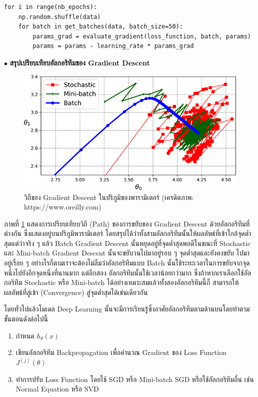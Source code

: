 \begin{lstlisting}[style=MyPython]
for i in range(nb_epochs):
    np.random.shuffle(data)
    for batch in get_batches(data, batch_size=50):
        params_grad = evaluate_gradient(loss_function, batch, params)
        params = params - learning_rate * params_grad
\end{lstlisting}

\noindent $\bullet$ \textbf{สรุปเปรียบเทียบอัลกอริทึมของ Gradient Descent}

\begin{figure}[H]
    \centering
    \includegraphics[width=0.9\linewidth]{fig/gradient_descent_path.png}
    \caption{วิถีของ Gradient Descent ในปริภูมิของพารามิเตอร์ (เครดิตภาพ: https://www.oreilly.com)}
    \label{fig:gradient_descent_path}
\end{figure}

ภาพที่ \ref{fig:gradient_descent_path} แสดงการเปรียบเทียบวิถี (Path) ของการขยับของ Gradient Descent ด้วยอัลกอริทึมที่ต่างกัน
ซึ่งแสดงอยู่บนปริภูมิพารามิเตอร์ โดยสรุปได้ว่าทั้งสามอัลกอริทึมนั้นให้ผลลัพธ์ที่เข้าใกล้จุดต่ำสุดแต่ว่าจริง ๆ แล้ว Batch Gradient Descent 
นั้นหยุดอยู่ที่จุดต่ำสุดพอดีในขณะที่ Stochastic และ Mini-batch Gradient Descent นั้นจะขยับวนไปมาอยู่รอบ ๆ จุดต่ำสุดและยังคงขยับ%
ไปมาอยู่เรื่อย ๆ อย่างไรก็ตามเราจะต้องไม่ลืมว่าอัลกอริทึมแบบ Batch นั้นใช้ระยะเวลาในการขยับจากจุดหนึ่งไปยังอีกจุดหนึ่งที่นานมาก แต่อีกสอง%
อัลกอริทึมนั้นใช้เวลาน้อยกว่ามาก ซึ่งถ้าหากเราเลือกใช้อัลกอริทึม Stochastic หรือ Mini-batch ได้อย่างเหมาะสมแล้วทั้งสองอัลกอริทึมนี้ก็%
สามารถให้ผลลัพธ์ที่ลู่เข้า (Convergence) สู่จุดต่ำสุดได้เช่นเดียวกัน

โดยทั่วไปแล้วโมเดล Deep Learning นั้นจะมีการเรียนรู้ซึ่งอาศัยอัลกอริทึมตามด้านบนโดยทำตามขั้นตอนดังต่อไปนี้

\begin{enumerate}[topsep=0pt,noitemsep]
    \item กำหนด $h_\theta(x)$
    
    \item เขียนอัลกอริทึม Backpropagation เพื่อคำนวณ Gradient ของ Loss Function $J^{(j)}(\theta)$
    
    \item ทำการปรับ Loss Function โดยใช้ SGD หรือ Mini-batch SGD หรือใช้อัลกอริทึมอื่น เช่น Normal Equation หรือ SVD
\end{enumerate}

